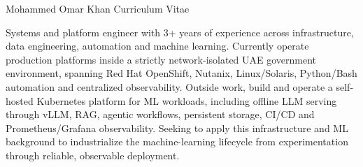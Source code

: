\documentclass[11pt, a4paper]{awesome-cv}
\begin{document}
\makecvheader[R]

\makecvfooter
  {Mohammed Omar Khan}
  {Curriculum Vitae}
  {\thepage}

\begin{cvparagraph}
Systems and platform engineer with 3+ years of experience across infrastructure, data engineering, automation and machine learning. Currently operate production platforms inside a strictly network-isolated UAE government environment, spanning Red Hat OpenShift, Nutanix, Linux/Solaris, Python/Bash automation and centralized observability. Outside work, build and operate a self-hosted Kubernetes platform for ML workloads, including offline LLM serving through vLLM, RAG, agentic workflows, persistent storage, CI/CD and Prometheus/Grafana observability. Seeking to apply this infrastructure and ML background to industrialize the machine-learning lifecycle from experimentation through reliable, observable deployment.
\end{cvparagraph}
\end{document}
